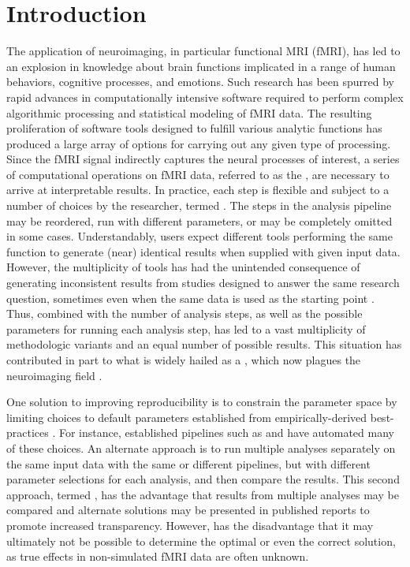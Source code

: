 \section{Introduction}

The application of neuroimaging, in particular functional MRI (fMRI), has led to an explosion in knowledge about brain functions implicated in a range of human behaviors, cognitive processes, and emotions. Such research has been spurred by rapid advances in computationally intensive software required to perform complex algorithmic processing and statistical modeling of fMRI data. The resulting proliferation of software tools designed to fulfill various analytic functions has produced a large array of options for carrying out any given type of processing. Since the fMRI signal indirectly captures the neural processes of interest, a series of computational operations on fMRI data, referred to as the , are necessary to arrive at interpretable results. In practice, each step is flexible and subject to a number of choices by the researcher, termed  \parencite{poldrack2017}. The steps in the analysis pipeline may be reordered, run with different parameters, or may be completely omitted in some cases. Understandably, users expect different tools performing the same function to generate (near) identical results when supplied with given input data. However, the multiplicity of tools has had the unintended consequence of generating inconsistent results from studies designed to answer the same research question, sometimes even when the same data is used as the starting point \parencite{botviniknezer2020}. Thus,  combined with the number of analysis steps, as well as the possible parameters for running each analysis step, has led to a vast multiplicity of methodologic variants and an equal number of possible results. This situation has contributed in part to what is widely hailed as a , which now plagues the neuroimaging field \parencite{gorgolewski2016b,poldrack2017}.

One solution to improving reproducibility is to constrain the parameter space by limiting choices to default parameters established from empirically-derived best-practices \parencite{gruning2018}. For instance, established pipelines such as  \parencite{esteban2019a} and  \parencite{craddock2013} have automated many of these choices. An alternate approach is to run multiple analyses separately on the same input data with the same or different pipelines, but with different parameter selections for each analysis, and then compare the results. This second approach, termed  \parencite{steegen2016}, has the advantage that results from multiple analyses may be compared and alternate solutions may be presented in published reports to promote increased transparency. However,  has the disadvantage that it may ultimately not be possible to determine the optimal or even the correct solution, as true effects in non-simulated fMRI data are often unknown. 

